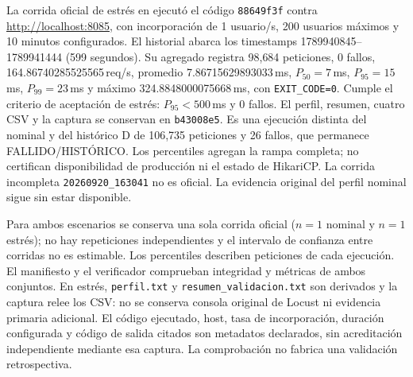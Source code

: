 \documentclass[11pt,a4paper]{article}
\begin{document}
La corrida oficial de estrés en  ejecutó el código \texttt{88649f3f} contra \url{http://localhost:8085}, con incorporación de 1 usuario/s, 200 usuarios máximos y 10 minutos configurados. El historial abarca los timestamps 1789940845--1789941444 (599 segundos). Su agregado registra 98{,}684 peticiones, 0 fallos, 164.86740285525565\,req/s, promedio 7.86715629893033\,ms, $P_{50}=7$\,ms, $P_{95}=15$\,ms, $P_{99}=23$\,ms y máximo 324.8848000075668\,ms, con \texttt{EXIT\_CODE=0}. Cumple el criterio de aceptación de estrés: $P_{95}<500$\,ms y 0 fallos. El perfil, resumen, cuatro CSV y la captura  se conservan en \texttt{b43008e5}. Es una ejecución distinta del nominal y del histórico D de 106{,}735 peticiones y 26 fallos, que permanece FALLIDO/HISTÓRICO. Los percentiles agregan la rampa completa; no certifican disponibilidad de producción ni el estado de HikariCP. La corrida incompleta \texttt{20260920\_163041} no es oficial. La evidencia original del perfil nominal sigue sin estar disponible.

Para ambos escenarios se conserva una sola corrida oficial ($n=1$ nominal y $n=1$ estrés); no hay repeticiones independientes y el intervalo de confianza entre corridas no es estimable. Los percentiles describen peticiones de cada ejecución. El manifiesto  y el verificador comprueban integridad y métricas de ambos conjuntos. En estrés, \texttt{perfil.txt} y \texttt{resumen\_validacion.txt} son derivados y la captura relee los CSV: no se conserva consola original de Locust ni evidencia primaria adicional. El código ejecutado, host, tasa de incorporación, duración configurada y código de salida citados son metadatos declarados, sin acreditación independiente mediante esa captura. La comprobación no fabrica una validación retrospectiva.
\end{document}

